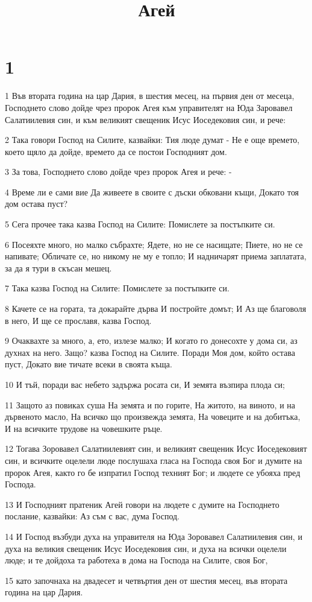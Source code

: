 

\title{Агей}


\chapter{1}

\par 1 Във втората година на цар Дария, в шестия месец, на първия ден от месеца, Господнето слово дойде чрез пророк Агея към управителят на Юда Заровавел Салатиилевия син, и към великият свещеник Исус Иоседековия син, и рече:
\par 2 Така говори Господ на Силите, казвайки: Тия люде думат - Не е още времето,  което щяло да дойде, времето да се постои Господният дом.
\par 3 За това, Господнето слово дойде чрез пророк Агея и рече: -
\par 4 Време ли е сами вие Да живеете в своите с дъски обковани къщи, Докато тоя дом остава пуст?
\par 5 Сега прочее така казва Господ на Силите: Помислете за постъпките си.
\par 6 Посеяхте много, но малко събрахте; Ядете, но не се насищате; Пиете, но не се напивате; Обличате се, но никому не му е топло; И надничарят приема заплатата, за да я тури в скъсан мешец.
\par 7 Така казва Господ на Силите: Помислете за постъпките си.
\par 8 Качете се на гората, та докарайте дърва И постройте домът; И Аз ще благоволя в него, И ще се прославя, казва Господ.
\par 9 Очаквахте за много, а, ето, излезе малко; И когато го донесохте у дома си, аз духнах на него. Защо? казва Господ на Силите. Поради Моя дом, който остава пуст, Докато вие тичате всеки в своята къща.
\par 10 И тъй, поради вас небето задържа росата си, И земята възпира плода си;
\par 11 Защото аз повиках суша На земята и по горите, На житото, на виното, и на дървеното масло, На всичко що произвежда земята, На човеците и на добитъка, И на всичките трудове на човешките  ръце.
\par 12 Тогава Зоровавел Салатиилевият син, и великият свещеник Исус Иоседековият син, и всичките оцелели люде послушаха гласа на Господа своя Бог и думите на пророк Агея, както го бе изпратил Господ техният Бог; и людете се убояха пред Господа.
\par 13 И Господният пратеник Агей говори на людете с думите на Господнето послание, казвайки: Аз съм с вас, дума Господ.
\par 14 И Господ възбуди духа на управителя на Юда Зоровавел Салатиилевия син, и духа на великия свещеник Исус Иоседековия син, и духа на всички оцелели люде; и те дойдоха та работеха в дома на Господа на Силите, своя Бог,
\par 15 като започнаха на двадесет и четвъртия ден от шестия месец, във втората година на цар Дария.

